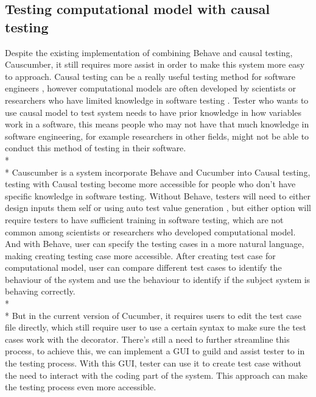 \subsection{Testing computational model with causal testing}
Despite the existing implementation of combining Behave and causal testing, Causcumber, it still requires more assist in order to make this system more easy to approach. Causal testing can be a really useful testing method for software engineers \cite{Reference19}, however computational models are often developed by scientists or researchers who have limited knowledge in software testing \cite{Reference13}. Tester who wants to use causal model to test system needs to have prior knowledge in how variables work in a software, this means people who may not have that much knowledge in software engineering, for example researchers in other fields, might not be able to conduct this method of testing in their software. \\*\\*
Causcumber is a system incorporate Behave and Cucumber into Causal testing, testing with Causal testing become more accessible for people who don’t have specific knowledge in software testing. Without Behave, testers will need to either design inputs them self or using auto test value generation \cite{Reference12}, but either option will require testers to have sufficient training in software testing, which are not common among scientists or researchers who developed computational model. And with Behave, user can specify the testing cases in a more natural language, making creating testing case more accessible. After creating test case for computational model, user can compare different test cases to identify the behaviour of the system and use the behaviour to identify if the subject system is behaving correctly.\\*\\*
But in the current version of Cucumber, it requires users to edit the test case file directly, which still require user to use a certain syntax to make sure the test cases work with the decorator. There’s still a need to further streamline this process, to achieve this, we can implement a GUI to guild and assist tester to in the testing process. With this GUI, tester can use it to create test case without the need to interact with the coding part of the system. This approach can make the testing process even more accessible.


